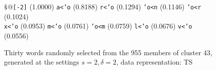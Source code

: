 \begin{figure}[!htb]
\begin{mdframed}
\begin{mdframed}
\begin{small}
\begin{tabbing}
\texttt{\v{s}}@\texttt{[-2]} \> (1.0000) \> \texttt{a<\a'{o}} \> (0.8188) \> \texttt{r<\a'{o}} \> (0.1294) \> \texttt{\a'{o}<n} \> (0.1146) \> \texttt{\a'{o}<r} \> (0.1024) \\
\texttt{x<\a'{o}} \> (0.0953) \> \texttt{m<\a'{o}} \> (0.0761) \> \texttt{\a'{o}<m} \> (0.0759) \> \texttt{l<\a'{o}} \> (0.0676) \> \texttt{v<\a'{o}} \> (0.0556)
\end{tabbing}
\end{small}
\end{mdframed}
\caption{Thirty words randomly selected from the 955 members of cluster 43, generated at the settings $s=2,\delta =2$, data representation: TS}
\label{fig:cluster-43-2-2-TS}
\end{mdframed}
\end{figure}
%
%

